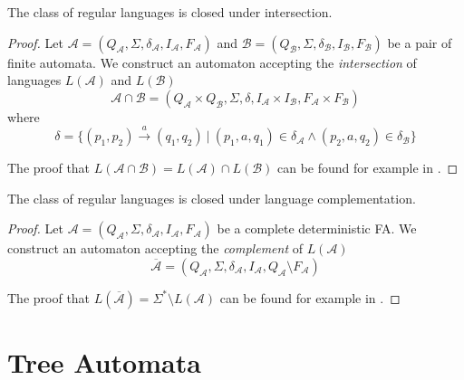   \begin{theorem}
	 The class of regular languages is closed under intersection.
	\end{theorem}
	
	\begin{proof}
Let $\mathcal{A} = (Q_\mathcal{A}, \Sigma, \delta_\mathcal{A}, I_\mathcal{A},
F_\mathcal{A})$ and $\mathcal{B} = (Q_\mathcal{B}, \Sigma, \delta_\mathcal{B},
I_\mathcal{B}, F_\mathcal{B})$ be a pair of finite automata. We construct an
automaton accepting the \emph{intersection} of languages $L(\mathcal{A})$ and
$L(\mathcal{B})$ 
\begin{equation}
\mathcal{A} \cap \mathcal{B} = (Q_\mathcal{A} \times
Q_\mathcal{B}, \Sigma, \delta, I_\mathcal{A} \times I_\mathcal{B}, F_\mathcal{A}
\times F_\mathcal{B})
\end{equation} where 
\begin{equation}
\delta = \{(p_1, p_2)
\overset{a}{\longrightarrow} (q_1, q_2)\ |\ (p_1, a, q_1) \in \delta_\mathcal{A}
\wedge (p_2, a, q_2) \in \delta_\mathcal{B}\}
\end{equation}
	
The proof that $L(\mathcal{A} \cap \mathcal{B}) = L(\mathcal{A}) \cap
L(\mathcal{B})$ can be found for example in \cite{tin}.
\end{proof}
	
 \begin{theorem}
  The class of regular languages is closed under language complementation.
\end{theorem}
	
	\begin{proof}
Let $\mathcal{A} = (Q_\mathcal{A}, \Sigma, \delta_\mathcal{A}, I_\mathcal{A},
F_\mathcal{A})$ be a complete deterministic FA. We construct an automaton
accepting the \emph{complement} of $L(\mathcal{A})$ 
\begin{equation}
\overline{\mathcal{A}} =
(Q_\mathcal{A}, \Sigma, \delta_\mathcal{A}, I_\mathcal{A}, Q_\mathcal{A}
\setminus F_\mathcal{A})
\end{equation}
	
The proof that $L(\overline{\mathcal{A}}) = \Sigma^* \setminus L(\mathcal{A})$
can be found for example in \cite{tin}.
 \end{proof}

 \section{Tree Automata}

